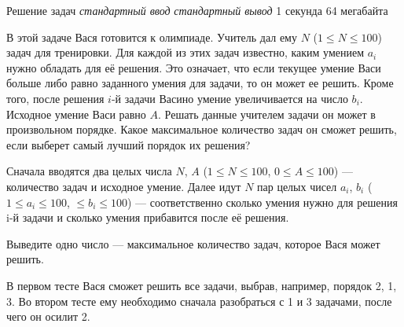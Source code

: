 \begin{problem}%
{Решение задач}%
{\textsl{стандартный ввод}}%
{\textsl{стандартный вывод}}%
{1 секунда}%
{64 мегабайта}{}

В этой задаче Вася готовится к олимпиаде. Учитель дал ему $N$ ($1 \le N \le 100$) задач для тренировки. Для каждой из этих задач известно, каким умением $a_i$ нужно обладать для её решения. Это означает, что если текущее умение Васи больше либо равно заданного умения для задачи, то он может ее решить. Кроме того, после решения $i$-й задачи Васино умение увеличивается на число $b_i$.\\

Исходное умение Васи равно $A$. Решать данные учителем задачи он может в произвольном порядке. Какое максимальное количество задач он сможет решить, если выберет самый лучший порядок их решения?

\InputFile

Сначала вводятся два целых числа $N$, $A$ ($1 \le N \le 100$, $0 \le A \le 100$) — количество задач и исходное умение. Далее идут $N$ пар целых чисел $a_i$, $b_i$ ($1 \le a_i \le 100$, $ \le b_i \le 100$) — соответственно сколько умения нужно для решения i-й задачи и сколько умения прибавится после её решения.

\OutputFile

Выведите одно число — максимальное количество задач, которое Вася может решить.

\Examples

\begin{example}
%
%
\end{example}

\Explanations

В первом тесте Вася сможет решить все задачи, выбрав, например, порядок 2, 1, 3. Во втором тесте ему необходимо сначала разобраться с 1 и 3 задачами, после чего он осилит 2.

\end{problem}